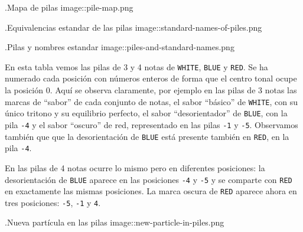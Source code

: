 \documentclass[]{article}
\begin{document}
.Mapa de pilas image::pile-map.png

.Equivalencias estandar de las pilas image::standard-names-of-piles.png

.Pilas y nombres estandar image::piles-and-standard-names.png

En esta tabla vemos las pilas de 3 y 4 notas de \texttt{WHITE}, \texttt{BLUE} y \texttt{RED}. Se ha numerado cada posición con números enteros de forma que el centro tonal ocupe la posición 0. Aquí se observa claramente, por ejemplo en las pilas de 3 notas las marcas de ``sabor'' de cada conjunto de notas, el sabor ``básico'' de \texttt{WHITE}, con su único tritono y su equilibrio perfecto, el sabor ``desorientador'' de \texttt{BLUE}, con la pila \texttt{-4} y el sabor ``oscuro'' de red, representado en las pilas \texttt{-1} y \texttt{-5}. Observamos también que que la desorientación de \texttt{BLUE} está presente también en \texttt{RED}, en la pila \texttt{-4}.

En las pilas de 4 notas ocurre lo mismo pero en diferentes posiciones: la desorientación de \texttt{BLUE} aparece en las posiciones \texttt{-4} y \texttt{-5} y se comparte con \texttt{RED} en exactamente las mismas posiciones. La marca oscura de \texttt{RED} aparece ahora en tres posiciones: \texttt{-5}, \texttt{-1} y \texttt{4}.

.Nueva partícula en las pilas image::new-particle-in-piles.png
\end{document}
